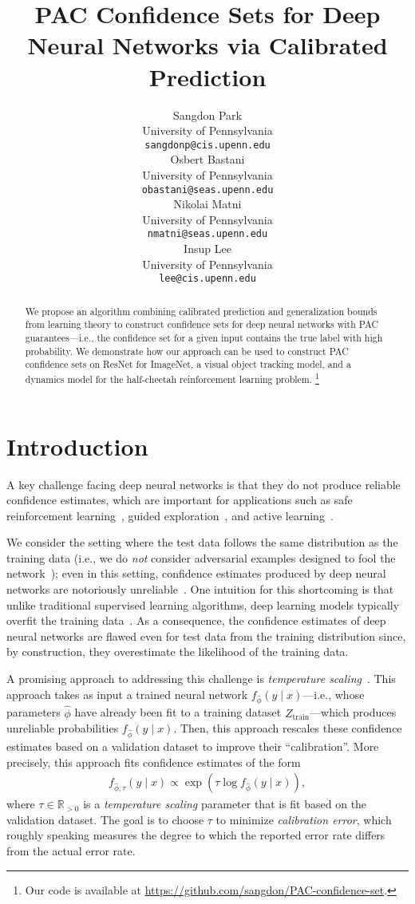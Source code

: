 \documentclass{article} \usepackage{iclr2020_conference,times}
\title{PAC Confidence Sets for Deep Neural Networks via Calibrated Prediction}
\author{Sangdon Park \\
University of Pennsylvania\\
\texttt{sangdonp@cis.upenn.edu} \\
\And
Osbert Bastani \\
University of Pennsylvania \\
\texttt{obastani@seas.upenn.edu} \\
\And
Nikolai Matni \\
University of Pennsylvania \\
\texttt{nmatni@seas.upenn.edu} \\
\And
\hspace{17ex} Insup Lee \\
\hspace{17.5ex} University of Pennsylvania \\
\hspace{17.5ex} \texttt{lee@cis.upenn.edu} \\
}
\renewcommand{\(}						{\left(}
\renewcommand{\)}						{\right)}
\renewcommand{\[}						{\left[}
\renewcommand{\]}						{\right]}
\newcommand{\<}						{\left<}
\renewcommand{\>}						{\right>}
\begin{document}
\maketitle

\begin{abstract}
We propose an algorithm combining calibrated prediction and generalization bounds from learning theory to construct confidence sets for deep neural networks with PAC guarantees---i.e., the confidence set for a given input contains the true label with high probability. We demonstrate how our approach can be used to construct PAC confidence sets on ResNet for ImageNet, a visual object tracking model, and a dynamics model for the half-cheetah reinforcement learning problem.
\footnote{Our code is available at \url{https://github.com/sangdon/PAC-confidence-set}.}
\end{abstract}



\section{Introduction}

A key challenge facing deep neural networks is that they do not produce reliable confidence estimates, which are important for applications such as safe reinforcement learning~\citep{berkenkamp2017safe}, guided exploration~\citep{malik2019calibrated}, and active learning~\citep{gal2017deep}.

We consider the setting where the test data follows the same distribution as the training data (i.e., we do \emph{not} consider adversarial examples designed to fool the network~\citep{Szegedy2014}); even in this setting, confidence estimates produced by deep neural networks are notoriously unreliable~\citep{guo2017calibration}. One intuition for this shortcoming is that unlike traditional supervised learning algorithms, deep learning models typically overfit the training data~\citep{zhang2017understanding}.
As a consequence, the confidence estimates of deep neural networks are flawed even for test data from the training distribution since, by construction, they overestimate the likelihood of the training data.

A promising approach to addressing this challenge is \emph{temperature scaling}~\citep{platt1999probabilistic}. This approach takes as input a trained neural network $f_{\hat{\phi}}(y\mid x)$---i.e., whose parameters $\hat{\phi}$ have already been fit to a training dataset $Z_{\text{train}}$---which produces unreliable probabilities $f_{\hat{\phi}}(y\mid x)$.
Then, this approach rescales these confidence estimates based on a validation dataset to improve their ``calibration''. More precisely, this approach fits confidence estimates of the form
\begin{align*}
f_{\hat{\phi},\tau}(y\mid x)\propto\exp(\tau\log f_{\hat{\phi}}(y\mid x)),
\end{align*}
where $\tau\in\mathbb{R}_{>0}$ is a \emph{temperature scaling} parameter that is fit based on the validation dataset. The goal is to choose $\tau$ to minimize \emph{calibration error}, which roughly speaking measures the degree to which the reported error rate differs from the actual error rate.
\end{document}

